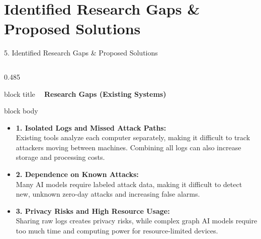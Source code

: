 \documentclass[aspectratio=169,10pt]{beamer}
\begin{document}


\section{Identified Research Gaps \& Proposed Solutions}

\begin{frame}[t]{5. Identified Research Gaps \& Proposed Solutions}
\vspace{-0.5em}
\begin{columns}[T]
\begin{column}{0.485\textwidth}
\begin{beamercolorbox}[rounded=true,shadow=false,sep=0.32em,wd=\linewidth]{block title}
\textbf{\scriptsize \textcolor{limitRed}{\textbullet\ } Research Gaps (Existing Systems)}
\end{beamercolorbox}
\vspace{0.1em}
\begin{beamercolorbox}[rounded=true,shadow=false,sep=0.40em,wd=\linewidth]{block body}
{\fontsize{7.0pt}{9.6pt}\selectfont
\begin{itemize}\itemsep0.48em
  \item \textbf{1. Isolated Logs and Missed Attack Paths:}\\
  Existing tools analyze each computer separately, making it difficult to track attackers moving between machines. Combining all logs can also increase storage and processing costs.
  
  \item \textbf{2. Dependence on Known Attacks:}\\
  Many AI models require labeled attack data, making it difficult to detect new, unknown zero-day attacks and increasing false alarms.
  
  \item \textbf{3. Privacy Risks and High Resource Usage:}\\
  Sharing raw logs creates privacy risks, while complex graph AI models require too much time and computing power for resource-limited devices.
\end{itemize}
}
\end{beamercolorbox}
\end{column}


\end{columns}
\end{frame}
\end{document}
